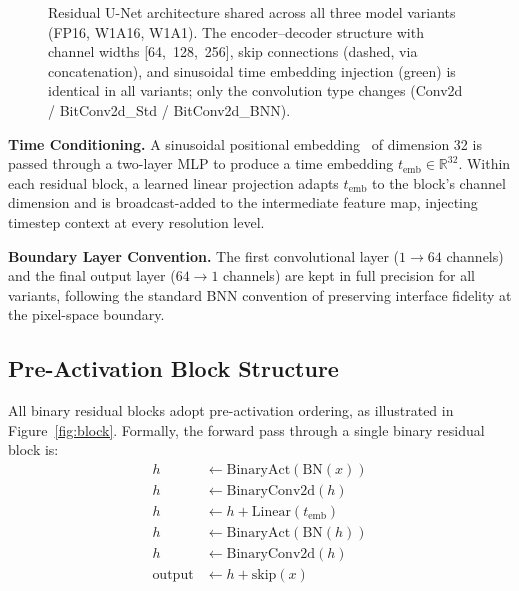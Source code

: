 \documentclass[conference]{IEEEtran}
\begin{document}
\begin{figure}[t]
\caption{Residual U-Net architecture shared across all three model variants (FP16,
W1A16, W1A1). The encoder--decoder structure with channel widths [64,~128,~256],
skip connections (dashed, via concatenation), and sinusoidal time embedding injection
(green) is identical in all variants; only the convolution type changes (Conv2d /
BitConv2d\_Std / BitConv2d\_BNN).}
\label{fig:arch}
\end{figure}

\textbf{Time Conditioning.} A sinusoidal positional
embedding~\cite{vaswani2017attention} of dimension 32 is passed through a two-layer MLP
to produce a time embedding $t_\text{emb} \in \mathbb{R}^{32}$. Within each residual
block, a learned linear projection adapts $t_\text{emb}$ to the block's channel
dimension and is broadcast-added to the intermediate feature map, injecting timestep
context at every resolution level.

\textbf{Boundary Layer Convention.} The first convolutional layer ($1{\to}64$ channels)
and the final output layer ($64{\to}1$ channels) are kept in full precision for all
variants, following the standard BNN convention of preserving interface fidelity at the
pixel-space boundary.

\subsection{Pre-Activation Block Structure}

All binary residual blocks adopt pre-activation ordering, as illustrated in
Figure~\ref{fig:block}. Formally, the forward pass through a single binary residual
block is:
\begin{align*}
  h &\leftarrow \text{BinaryAct}\!\left(\text{BN}(x)\right) \\
  h &\leftarrow \text{BinaryConv2d}(h) \\
  h &\leftarrow h + \text{Linear}(t_\text{emb}) \\
  h &\leftarrow \text{BinaryAct}\!\left(\text{BN}(h)\right) \\
  h &\leftarrow \text{BinaryConv2d}(h) \\
  \text{output} &\leftarrow h + \text{skip}(x)
\end{align*}
\end{document}
